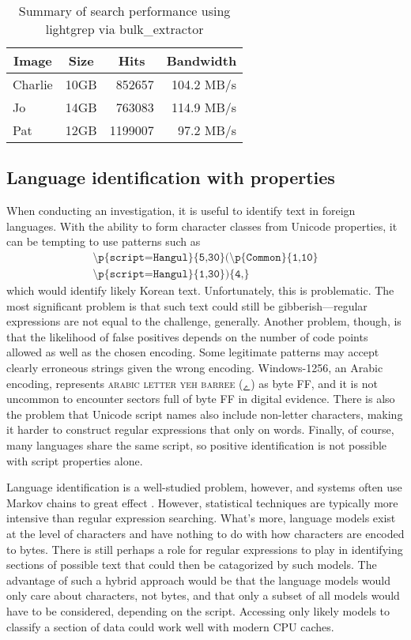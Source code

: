 \documentclass[5p,final,number,sort&compress]{elsarticle}
\newcommand{\re}[1]{\texttt{#1}}
\newcommand*{\whack}{\textbackslash}
\begin{document}
\begin{table}
\centering
\small
\begin{tabular}{lrrr}
  \multicolumn{1}{c}{Image} & \multicolumn{1}{c}{Size} & \multicolumn{1}{c}{Hits} & \multicolumn{1}{c}{Bandwidth} \\
  \hline
  Charlie & 10GB &  852657 & 104.2 MB/s \\
  Jo      & 14GB &  763083 & 114.9 MB/s \\
  Pat     & 12GB & 1199007 & 97.2 MB/s  \\
  \hline
\end{tabular}
\caption{Summary of search performance using lightgrep via bulk\_extractor\label{table:experiment}}
\end{table}

\subsection{Language identification with properties}

When conducting an investigation, it is useful to identify text in foreign languages. With the ability to form character classes from Unicode properties, it can be tempting to use patterns such as
\begin{multline*}
  \re{\whack p\{script=Hangul\}\{5,30\}(\whack p\{Common\}\{1,10\}}\\
    \re{\whack p\{script=Hangul\}\{1,30\})\{4,\}}
\end{multline*}
which would identify likely Korean text. Unfortunately, this is problematic. The most significant problem is that such text could still be gibberish---regular expressions are not equal to the challenge, generally. Another problem, though, is that the likelihood of false positives depends on the number of code points allowed as well as the chosen encoding. Some legitimate patterns may accept clearly erroneous strings given the wrong encoding. Windows-1256, an Arabic encoding, represents \textsc{arabic letter yeh barree} ({ے}) as byte FF, and it is not uncommon to encounter sectors full of byte FF in digital evidence. There is also the problem that Unicode script names also include non-letter characters, making it harder to construct regular expressions that only on words. Finally, of course, many languages share the same script, so positive identification is not possible with script properties alone.

Language identification is a well-studied problem, however, and systems often use Markov chains to great effect \citep{brownlang}. However, statistical techniques are typically more intensive than regular expression searching. What's more, language models exist at the level of characters and have nothing to do with how characters are encoded to bytes. There is still perhaps a role for regular expressions to play in identifying sections of possible text that could then be catagorized by such models. The advantage of such a hybrid approach would be that the language models would only care about characters, not bytes, and that only a subset of all models would have to be considered, depending on the script. Accessing only likely models to classify a section of data could work well with modern CPU caches.
\end{document}
